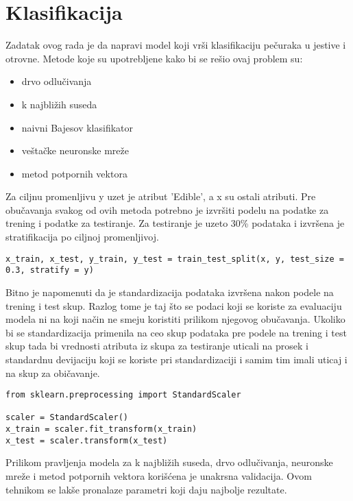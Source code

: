 \documentclass[a4paper]{article}
\begin{document}
\section{Klasifikacija}
\label{sec:klasifikacija}
Zadatak ovog rada je da napravi model koji vrši klasifikaciju pečuraka u jestive i otrovne. Metode koje su upotrebljene kako bi se rešio ovaj problem su:
\begin{itemize}
    \item drvo odlučivanja
    \item k najbližih suseda
    \item naivni Bajesov klasifikator
    \item veštačke neuronske mreže
    \item metod potpornih vektora
\end{itemize}

Za ciljnu promenljivu y uzet je atribut 'Edible', a x su ostali atributi. Pre obučavanja svakog od ovih metoda potrebno je izvršiti podelu na podatke za trening i podatke za testiranje. Za testiranje je uzeto 30\% podataka i izvršena je stratifikacija po ciljnoj promenljivoj.
\begin{lstlisting}[caption={Podela na podatke za trening i obučavanje},frame=single, label=simple]
x_train, x_test, y_train, y_test = train_test_split(x, y, test_size = 0.3, stratify = y)
\end{lstlisting}

Bitno je napomenuti da je standardizacija podataka izvršena nakon podele na trening i test skup. Razlog tome je taj što se podaci koji se koriste za evaluaciju modela ni na koji način ne smeju koristiti prilikom njegovog obučavanja. Ukoliko bi se standardizacija primenila na ceo skup podataka pre podele na trening i test skup tada bi vrednosti atributa iz skupa za testiranje uticali na prosek i standardnu devijaciju koji se koriste pri standardizaciji i samim tim imali uticaj i na skup za običavanje\cite{masinsko}.
\begin{lstlisting}[caption={Standardizacija skupova za obučavanje i testiranje},frame=single, label=simple]
from sklearn.preprocessing import StandardScaler

scaler = StandardScaler()
x_train = scaler.fit_transform(x_train)
x_test = scaler.transform(x_test)
\end{lstlisting}


Prilikom pravljenja modela za k najbližih suseda, drvo odlučivanja, neuronske mreže i metod potpornih vektora korišćena je unakrsna validacija. Ovom tehnikom se lakše pronalaze parametri koji daju najbolje rezultate.
\end{document}
